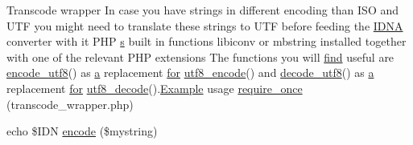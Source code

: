 \begin{DoxyCompactItemize}
\item 
Transcode wrapper In case you have strings in different encoding than I\+SO and U\+TF you might need to translate these strings to U\+TF before feeding the \hyperlink{ReadMe_8txt_a5d4f4ee07624e2d22494ccae4cc77d48}{I\+D\+NA} converter with it P\+HP \hyperlink{respond_8min_8js_ad9a7d92cb87932d25187fdec3ba1b621}{s} built in functions libiconv or mbstring installed together with one of the relevant P\+HP extensions The functions you will \hyperlink{image__link_2tpl_2popup_8js_a0324d76c66db8f52a2225aaaae6ade94}{find} useful are \hyperlink{transcode__wrapper_8php_a2ff254e88e75a9b65a7f7ed6701d9307}{encode\+\_\+utf8}() as \hyperlink{jqplot_8barRenderer_8min_8js_a15f14caa0c9de3a415d8eb9d88378fc0}{a} replacement \hyperlink{document__category_8js_aa303d4e538a4022d72a50a7ad8ee9799}{for} \hyperlink{ReadMe_8txt_ad2cb466e866a85c1ddff5eb4320f0ef1}{utf8\+\_\+encode}() and \hyperlink{transcode__wrapper_8php_ad2fd4d69808391b53e99415b7e7d593b}{decode\+\_\+utf8}() as \hyperlink{jqplot_8barRenderer_8min_8js_a15f14caa0c9de3a415d8eb9d88378fc0}{a} replacement \hyperlink{document__category_8js_aa303d4e538a4022d72a50a7ad8ee9799}{for} \hyperlink{ReadMe_8txt_ac2e4651b745884c7e260ebbc00410561}{utf8\+\_\+decode}().\hyperlink{JSSpec_8js_af5cdd6ea63af2a2db1657e4cdc549286}{Example} usage \hyperlink{ReadMe_8txt_a81b31ad37fad0079bd14d86a4889ffa0}{require\+\_\+once} (\textquotesingle{}transcode\+\_\+wrapper.\+php\textquotesingle{})
\item 
echo \$I\+DN \hyperlink{ReadMe_8txt_a7fcb4e5f2b1b63096ccac2903dfbef97}{encode} (\$mystring)
\end{DoxyCompactItemize}
